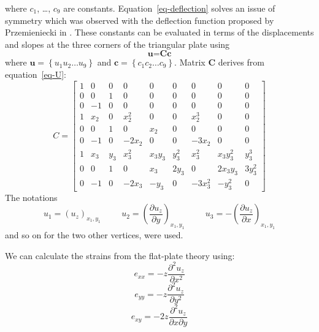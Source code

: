 \documentclass{llncs}
\begin{document}
where $c_1$, \ldots , $c_9$ are constants. Equation~\ref{eq-deflection} solves an issue of symmetry which was observed with the deflection function proposed by Przemieniecki in \cite{Przemieniecki68}. These constants can be evaluated in terms of the displacements and slopes at the three corners of the triangular plate using 
\begin{equation}
\textbf{u} = \textbf{Cc}
\label{eq-U}
\end{equation} 
where $\textbf{u} = \left\{u_1 u_2 \ldots u_9 \right\} $ and $\textbf{c} = \left\{c_1 c_2 \ldots c_9 \right\} $. Matrix $\textbf{C}$ derives from equation~\ref{eq-U}:
\begin{equation}
C = 
	\begin{bmatrix}
	1 & 0 & 0 & 0 & 0 & 0 & 0 & 0 & 0 \\
 	0 & 0 & 1 & 0 & 0 & 0 & 0 & 0 & 0 \\
	0 & -1 & 0 & 0 & 0 & 0 & 0 & 0 & 0 \\
	1 & x_2 & 0 & x_2^2 & 0 & 0 & x_2^3 & 0 & 0 \\
	0 & 0 & 1 & 0 & x_2 & 0 & 0 & 0 & 0 \\
	0 & -1 & 0 & -2x_2 & 0 & 0 & -3x_2 & 0 & 0 \\
	1 & x_3 & y_3 & x_3^2 & x_3y_3 & y_3^2 & x_3^2 & x_3y_3^2& y_3^3 \\
	0 & 0 & 1 & 0 & x_3 & 2y_3 & 0 & 2x_3y_3 & 3y_3^2 \\
	0 & -1 & 0 & -2x_3 & -y_3 & 0 & -3x_3^2 & -y_3^2 & 0
	\end{bmatrix}
\end{equation} 
The notations 
\begin{equation}
u_1 = (u_z)_{x_1,y_1} \hspace{1cm} u_2 = \left(\frac{\partial u_z}{\partial y}\right)_{x_1,y_1} \hspace{1cm} u_3 = - \left(\frac{\partial u_z}{\partial x}\right)_{x_1,y_1}
\end{equation} 
and so on for the two other vertices, were used.

We can calculate the strains from the flat-plate theory using:
\begin{equation}
e_{xx} = -z \frac{\partial^2u_z}{\partial x^2}
\end{equation} 
\begin{equation}
e_{yy} = -z \frac{\partial^2u_z}{\partial y^2}
\end{equation} 
\begin{equation}
e_{xy} = -2z \frac{\partial^2u_z}{\partial x \partial y}
\end{equation} 
\end{document}

